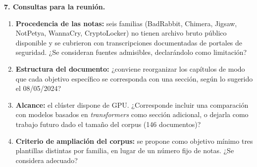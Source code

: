 \documentclass[11pt,a4paper]{article}
\begin{document}
\textbf{7. Consultas para la reunión.}

\begin{enumerate}[label=\alph*)]
\item \textbf{Procedencia de las notas:} seis familias (BadRabbit, Chimera, Jigsaw, NotPetya,
WannaCry, CryptoLocker) no tienen archivo bruto público disponible y se cubrieron con
transcripciones documentadas de portales de seguridad. ¿Se consideran fuentes admisibles,
declarándolo como limitación?
\item \textbf{Estructura del documento:} ¿conviene reorganizar los capítulos de modo que cada
objetivo específico se corresponda con una sección, según lo sugerido el 08/05/2024?
\item \textbf{Alcance:} el clúster dispone de GPU. ¿Corresponde incluir una comparación con
modelos basados en \emph{transformers} como sección adicional, o dejarla como trabajo futuro
dado el tamaño del corpus (146 documentos)?
\item \textbf{Criterio de ampliación del corpus:} se propone como objetivo mínimo tres
plantillas distintas por familia, en lugar de un número fijo de notas. ¿Se considera adecuado?
\end{enumerate}
\end{document}
